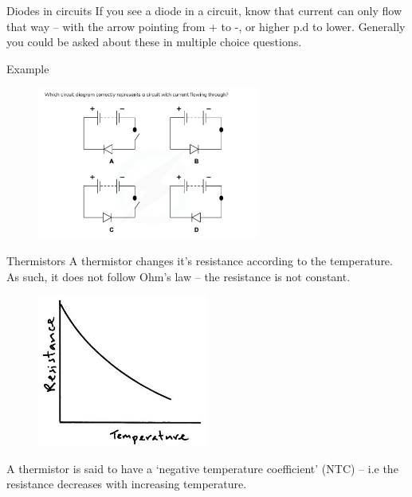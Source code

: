 \documentclass[../Main.tex]{subfiles}
\begin{document}
\begin{frame}{Diodes in circuits}
If you see a diode in a circuit, know that current can only flow that way -- with the arrow pointing from + to -, or higher p.d to lower. Generally you could be asked about these in multiple choice questions.
\pause
\begin{exampleblock}{Example}
\begin{figure}
    \centering
    \includegraphics[height=5cm]{Electricity_Images/diodes_mcq.jpg}
\end{figure}
\end{exampleblock}
\end{frame}

\begin{frame}{Thermistors}
    A thermistor changes it's resistance according to the temperature. As such, it does not follow Ohm's law -- the resistance is not constant.
    
    \begin{figure}
        \centering
        \includegraphics[height=5cm]{Electricity_Images/ntc_thermistor.jpg}
    \end{figure}
    
    A thermistor is said to have a `negative temperature coefficient' (NTC) -- i.e the resistance decreases with increasing temperature.
\end{frame}
\end{document}
